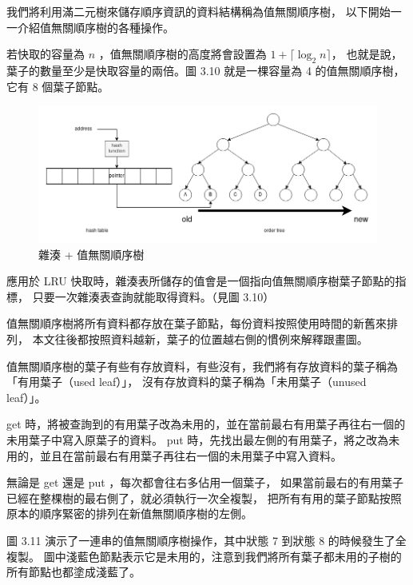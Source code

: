 我們將利用滿二元樹來儲存順序資訊的資料結構稱為值無關順序樹，
以下開始一一介紹值無關順序樹的各種操作。

若快取的容量為 $n$ ，值無關順序樹的高度將會設置為 $1 + \lceil \log_2 n \rceil$，
也就是說，葉子的數量至少是快取容量的兩倍。圖 3.10 就是一棵容量為 4 的值無關順序樹，它有 8 個葉子節點。

\begin{figure}[h!]
\includegraphics[width=\textwidth]{雜湊順序樹}
\caption{雜湊 + 值無關順序樹}
\end{figure}

應用於 LRU 快取時，雜湊表所儲存的值會是一個指向值無關順序樹葉子節點的指標，
只要一次雜湊表查詢就能取得資料。（見圖 3.10）

值無關順序樹將所有資料都存放在葉子節點，每份資料按照使用時間的新舊來排列，
本文往後都按照資料越新，葉子的位置越右側的慣例來解釋跟畫圖。

值無關順序樹的葉子有些有存放資料，有些沒有，我們將有存放資料的葉子稱為「有用葉子（used leaf）」，
沒有存放資料的葉子稱為「未用葉子（unused leaf）」。

get 時，將被查詢到的有用葉子改為未用的，並在當前最右有用葉子再往右一個的未用葉子中寫入原葉子的資料。
put 時，先找出最左側的有用葉子，將之改為未用的，並且在當前最右有用葉子再往右一個的未用葉子中寫入資料。

無論是 get 還是 put ，每次都會往右多佔用一個葉子，
如果當前最右的有用葉子已經在整棵樹的最右側了，就必須執行一次全複製，
把所有有用的葉子節點按照原本的順序緊密的排列在新值無關順序樹的左側。

圖 3.11 演示了一連串的值無關順序樹操作，其中狀態 7 到狀態 8 的時候發生了全複製。
圖中淺藍色節點表示它是未用的，注意到我們將所有葉子都未用的子樹的所有節點也都塗成淺藍了。


